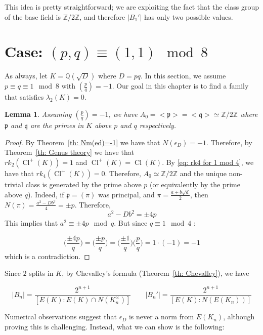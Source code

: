 \documentclass{article}
\numberwithin{equation}{section}
\theoremstyle{plain}  %
\newtheorem{lemma}{Lemma}[section]
\theoremstyle{definition}
\newcommand{\Z}{\mathbb{Z}}
\newcommand{\Q}{\mathbb{Q}}
\newcommand{\kron}[2]{\left( \tfrac{#1}{#2} \right)}
\DeclareMathOperator{\Cl}{Cl}
\newcommand{\fk}{\mathfrak }
\begin{document}
This idea is pretty straightforward; we are exploiting the fact that the class group of the base field is $\Z / 2\Z$, and therefore $|B_1'|$ has only two possible values.







\section{Case: \texorpdfstring{$(p,q) \equiv (1,1) \mod 8$}{(p,q)= (1,1) mod 8}}
As always, let $K=\Q(\sqrt{D})$ where $D=pq$. In this section, we assume $p\equiv q \equiv 1 \mod 8$ with $\kron{p}{q}=-1$. Our goal in this chapter is to find a family that satisfies $\lambda_2(K)=0$. 

\begin{lemma} \label{lem: A0=C2}
    Assuming $\kron{p}{q}=-1$, we have $A_0=<\fk p>=<\fk q> \simeq \Z/2\Z$ where $\fk p$ and $\fk q$ are the primes in $K$ above $p$ and $q$ respectively.
\end{lemma}

\begin{proof}
    By Theorem~\ref{th: Nm(ed)=-1} we have that $N(\epsilon_D)=-1$. Therefore, by Theorem~\ref{th: Genus theory} we have that \\ $rk_2(\Cl^+(K))=1$ and $\Cl^+(K)=\Cl(K)$. By \ref{eq: rk4 for 1 mod 4}, we have that $rk_4(\Cl^+(K))=0$. Therefore, $A_0\simeq \Z/2\Z$ and the unique non-trivial class is generated by the prime above $p$ (or equivalently by the prime above $q$). Indeed, if $\fk p = (\pi)$ was principal, and $\pi = \frac{a+b \sqrt{d}}{2}$, then $N(\pi) = \frac{a^2-Db^2}{4}= \pm p$. Therefore, 
    $$a^2-Db^2 = \pm 4p $$
    This implies that $a^2 \equiv \pm 4 p \mod q$. But since $q\equiv 1 \mod 4$ : 

    $$\Big(\frac{\pm 4p}{q}\Big)=\Big(\frac{\pm p}{q}\Big)
=\Big(\frac{\pm 1}{q}\Big)\Big(\frac{p}{q}\Big)
=1\cdot (-1)=-1$$ which is a contradiction.
\end{proof}

Since $2$ splits in $K$, by Chevalley's formula (Theorem~\ref{th: Chevalley}), we have 

\begin{equation}
    |B_n|=\frac{2^{n+1}}{[E(K):E(K)\cap N(K_n^\times)]} \qquad |B_n'|=\frac{2^{n+1}}{[E(K):N(E(K_n))]}
\end{equation}


Numerical observations suggest that $\epsilon_D$ is never a norm from $E(K_n)$, although proving this is challenging. Instead, what we can show is the following:
\end{document}
